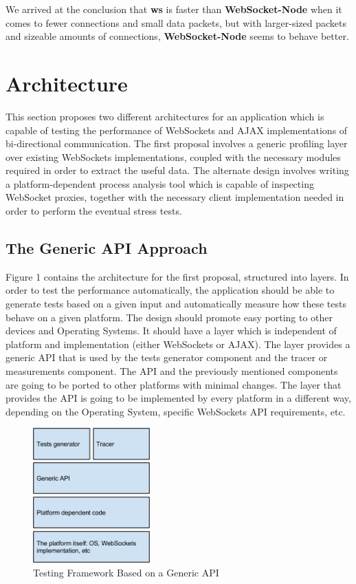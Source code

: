 \documentclass[conference]{IEEEtran}
\begin{document}
We arrived at the conclusion that \textbf{ws} is faster than
\textbf{WebSocket-Node} when it comes to fewer connections and small data
packets, but with larger-sized packets and sizeable amounts of connections,
\textbf{WebSocket-Node} seems to behave better.

\section{Architecture}
This section proposes two different architectures for an application which is capable
of testing the performance of WebSockets and AJAX implementations of bi-directional
communication. The first proposal involves a generic profiling layer over
existing WebSockets implementations, coupled with the necessary modules required
in order to extract the useful data. The alternate design involves writing a
platform-dependent process analysis tool which is capable of inspecting WebSocket
proxies, together with the necessary client implementation needed in order to
perform the eventual stress tests.

\subsection{The Generic API Approach}
Figure 1 contains the architecture for the first proposal, structured into layers.
In order to test the performance automatically, the application should be able
to generate tests based on a given input and automatically measure how these tests
behave on a given platform. The design should promote easy porting to other devices
and Operating Systems. It should have a layer which is independent of 
platform and implementation (either WebSockets or AJAX). The layer provides a generic
API that is used by the tests generator component and the tracer or measurements
component. The API and the previously mentioned components are going to be ported
to other platforms with minimal changes. The layer that provides the API is going
to be implemented by every platform in a different way, depending on the
Operating System, specific WebSockets API requirements, etc.
\\
\begin{frame}{}
  \begin{figure}
    \centering
    \includegraphics[width=0.4\textwidth]{img/architecture.png}
    \caption{Testing Framework Based on a Generic API}
  \end{figure}
\end{frame}
\indent
\end{document}
